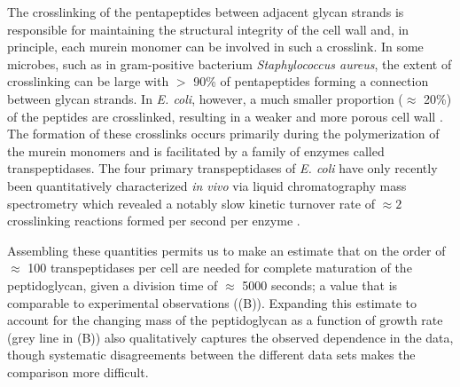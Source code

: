 The crosslinking of the pentapeptides between adjacent glycan strands is
responsible for maintaining the structural integrity of the cell wall and, in
principle, each murein monomer can be involved in such a crosslink. In some
microbes, such as in gram-positive bacterium \textit{Staphylococcus aureus},
the extent of crosslinking can be large with $>$ 90\% of pentapeptides
forming a connection between glycan strands. In \textit{E. coli}, however, a
much smaller proportion ($\approx$ 20\%) of the peptides are crosslinked,
resulting in a weaker and more porous cell wall \cite{vollmer2008a,
rogers1980}. The formation of these crosslinks occurs primarily during the
polymerization of the murein monomers and is facilitated by a family of
enzymes called transpeptidases. The four primary transpeptidases of
\textit{E. coli} have only recently been quantitatively characterized
\textit{in vivo} via liquid chromatography mass spectrometry which revealed a notably slow kinetic turnover rate
of $\approx 2$ crosslinking reactions formed per second per enzyme \citep{catherwood2020}.

Assembling these quantities permits us to make an estimate that on the order of
$\approx$ 100 transpeptidases per cell are needed for complete maturation of the
peptidoglycan, given a division time of $\approx$ 5000 seconds; a value that is
comparable to experimental observations ((B)). Expanding this
estimate to account for the changing mass of the peptidoglycan as a function
of growth rate (grey line in (B)) also qualitatively captures
the observed dependence in the data, though systematic disagreements between the
different data sets makes the comparison more difficult.

